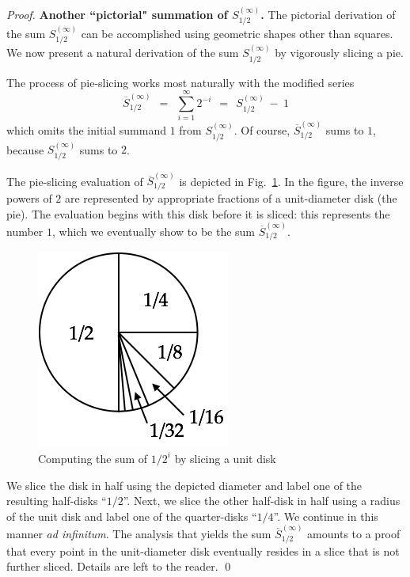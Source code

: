\begin{proof}
{\bf Another ``pictorial" summation of $S^{(\infty)}_{1/2}$.}
The pictorial derivation of the sum $S^{(\infty)}_{1/2}$ can be accomplished using geometric shapes other than squares.  We now present a natural derivation of the sum $S^{(\infty)}_{1/2}$ by vigorously slicing a pie.

The process of pie-slicing works most naturally with the modified series
\[ \overline{S}^{(\infty)}_{1/2} \ \ = \ \ \sum_{i=1}^\infty 2^{-i} \ \ = \ \ S^{(\infty)}_{1/2} \ - \ 1 \]
which omits the initial summand $1$ from $S^{(\infty)}_{1/2}$.  Of course, $\overline{S}^{(\infty)}_{1/2}$ sums to $1$, because $S^{(\infty)}_{1/2}$ sums to $2$.

\medskip

The pie-slicing evaluation of $\overline{S}^{(\infty)}_{1/2}$ is depicted in Fig.~\ref{fig:sumGeo1sur2circle}.  In the figure, the inverse powers of $2$ are represented by appropriate fractions of a unit-diameter disk (the pie).  The evaluation begins with this disk before it is sliced: this represents the number $1$, which we eventually show to be the sum
$\overline{S}^{(\infty)}_{1/2}$.
\begin{figure}[htb]
\begin{center}
       \includegraphics[scale=0.35]{FiguresMaths/SumGeometric1sur2circle}
\caption{Computing the sum of $1/2^i$ by slicing a unit disk}
       \label{fig:sumGeo1sur2circle}
\end{center}
\end{figure}
We slice the disk in half using the depicted diameter and label one of the resulting half-disks ``$1/2$''.  Next, we slice the other half-disk in half using a radius of the unit disk and label one of the quarter-disks ``$1/4$''.  We continue in this manner {\em ad infinitum}.  The analysis that yields the sum $\overline{S}^{(\infty)}_{1/2}$ amounts to a proof that every point in the unit-diameter disk eventually resides in a slice that is not further sliced.  Details are left to the reader.  \qed
\end{proof}


